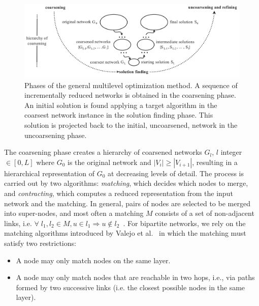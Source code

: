 \documentclass[runningheads]{llncs}
\begin{document}

\begin{figure}\centering
 \includegraphics[width=\textwidth]{mlf}
  \caption{Phases of the general multilevel optimization method.
  A sequence of incrementally reduced networks is obtained in the coarsening phase.
  An initial solution is found applying a target algorithm in the coarsest network instance in the solution finding phase. This solution is projected back to the initial, uncoarsened, network in the uncoarsening phase.
  }\label{mlf}
\end{figure}

The coarsening phase creates a hierarchy of coarsened networks $G_l$, $l$ integer $ \in [0,L]$ where $G_0$ is the original network and $|V_i| \geq |V_{i+1}|$, resulting in a hierarchical representation of $G_0$ at decreasing levels of detail.
The process is carried out by two algorithms: \emph{matching}, which decides which nodes to merge,
and \emph{contracting}, which computes a reduced representation from the input network and the matching.
In general, pairs of nodes are selected to be merged into super-nodes, and
most often a matching $M$ consists of a set of non-adjacent links,
i.e. $\forall\; l_1, l_2 \in M, u \in l_1 \Rightarrow u \notin l_2$~\cite{co1,co2}.
For bipartite networks, we rely on the matching algorithms introduced by Valejo et al.~\cite{alan2} in which the matching must satisfy two restrictions:

\begin{itemize}
  \item A node may only match nodes on the same layer.
  \item A node may only match nodes that are reachable in two hops, i.e., via paths formed by two successive links    (i.e.  the closest possible nodes in the same layer).
\end{itemize}
\end{document}
